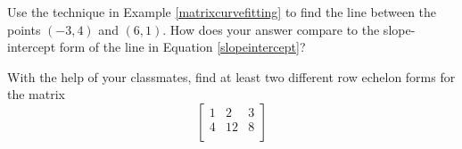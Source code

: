 \documentclass{ximera}
\begin{document}
\begin{problem}
Use the technique in Example \ref{matrixcurvefitting} to find the line between the points $(-3, 4)$ and $(6, 1)$. How does your answer compare to the slope-intercept form of the line in Equation \ref{slopeintercept}?
\end{problem}

\begin{problem}
With the help of your classmates, find at least two different row echelon forms for the matrix \[\left[ \begin{array}{rr|r} 
1 & 2 & 3 \\ 
4 & 12 & 8  \\ 
\end{array} \right]\]
\end{problem} 
\end{document}
